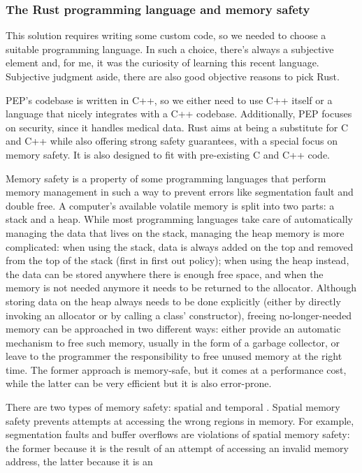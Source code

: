 \documentclass{report}
\begin{document}
\subsubsection{The Rust programming language and memory safety}
This solution requires writing some custom code, so we needed to choose a suitable programming language. In such a choice, there's always a subjective element and, for me, it was
the curiosity of learning this recent language. Subjective judgment aside, there are also good objective reasons to pick Rust. \par
PEP's codebase is written in C++, so we either need to use C++ itself or a language that nicely integrates with a C++ codebase. Additionally, PEP focuses on security, since it
handles medical data. Rust aims at being a substitute for C and C++ while also offering strong safety guarantees, with a special focus on memory safety. It is also designed to fit
with pre-existing C and C++ code. \par
Memory safety is a property of some programming languages that perform memory management in such a way to prevent errors like segmentation fault and double free. A computer's
available volatile memory is split into two parts: a stack and a heap. While most programming languages take care of automatically managing the data that lives on the stack,
managing the heap memory is more complicated: when using the stack, data is always added on the top and removed from the top of the stack (first in first out policy); when using the heap instead, the data can
be stored anywhere there is enough free space, and when the memory is not needed anymore it needs to be returned to the allocator. Although storing data on the heap always needs to
be done explicitly (either by directly invoking an allocator or by calling a class' constructor), freeing no-longer-needed memory can be approached in two different ways: either provide an automatic mechanism to free such memory, usually in the form of a
garbage collector, or leave to the programmer the responsibility to free unused memory at the right time. The former approach is memory-safe, but it comes at a performance cost,
while the latter can be very efficient but it is also error-prone. \par
There are two types of memory safety: spatial and temporal \cite{eternal-war-in-memory}. Spatial memory safety prevents attempts at accessing the wrong regions in memory. For example, segmentation faults and
buffer overflows are violations of spatial memory safety: the former because it is the result of an attempt of accessing an invalid memory address, the latter because it is an
\end{document}
